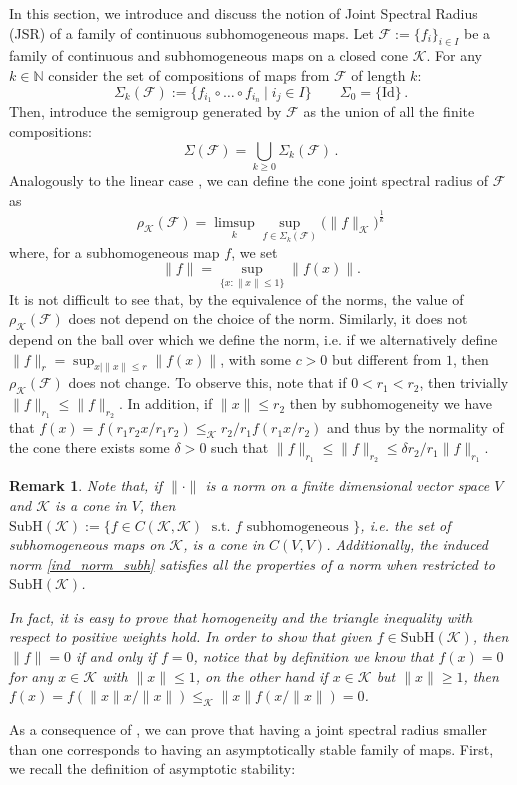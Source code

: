 \documentclass{article}
\newtheorem{remark}[theorem]{Remark}
\newcommand{\N}{\mathbb{N}}
\newcommand{\family}{\mathcal{F}}
\newcommand{\cradius}{\rho_{\cone}}
\newcommand{\comp}{\circ}
\newcommand{\cone}{\mathcal{K}}
\newcommand{\cleq}{\leq_{\cone}}
\begin{document}
In this section, we introduce and discuss the notion of Joint Spectral Radius (JSR) of a family of continuous subhomogeneous maps.
%
Let $\family:=\{f_i\}_{i\in I}$ be a family of continuous and subhomogeneous maps on a closed cone $\cone$. For any $k\in\N$ consider the set of compositions of maps from $\family$ of length $k$: 
\begin{equation}
\Sigma_k(\family):=\{f_{i_1}\comp \dots \comp f_{i_n}\:|\; i_j\in I\}\qquad \Sigma_0=\{\mathrm{Id}\}\,.
\end{equation}
%
Then, introduce the semigroup generated by $\family$ as the union of all the finite compositions:
%
\begin{equation}
\Sigma(\family)=\bigcup_{k\geq 0}\Sigma_k(\family)\,.
\end{equation}
%
Analogously to the linear case \cite{jungers2009joint}, we can define the cone joint spectral radius of $\family$ as
%
\begin{equation}\label{Cone_joint_spectral_radius}
\cradius(\family)=\limsup_{k}\sup_{f\in\Sigma_k(\family)}\big(\|f\|_{\cone}\big)^{\frac{1}{k}}
\end{equation}
where, for a subhomogeneous map $f$, we set
\begin{equation}\label{ind_norm_subh}
    \|f\|=\sup_{\{x:\|x\|\leq 1\}} \|f(x)\|.
\end{equation}
%
It is not difficult to see that, by the equivalence of the norms, the value of $\cradius(\family)$ does not depend on the choice of the norm. Similarly, it does not depend on the ball over which we define the norm, i.e. if we alternatively define $\|f\|_{r}=\sup_{x|\|x\|\leq r}\|f(x)\|$, with some $c>0$ but different from $1$, then $\cradius(\family)$ does not change. To observe this, note that if $0<r_1<r_2$, then trivially $\|f\|_{r_1}\leq \|f\|_{r_2}$. In addition, if $\|x\|\leq r_2$ then by subhomogeneity we have that $f(x)=f (r_1r_2x/r_1r_2)\cleq 
 r_2/r_1f(r_1x/r_2)$  and thus by the normality of the cone there exists some $\delta>0$ such that $\|f\|_{r_1}\leq \|f\|_{r_2}\leq \delta r_2/r_1 \|f\|_{r_1}$. 
%
\begin{remark}\label{rmk:norm_is_a_norm}
    Note that, if $\|\cdot\|$ is a norm on a finite dimensional vector space $V$ and $\cone$ is a cone in $V$, then $\text{SubH}(\cone):=\{f\in C(\cone,\cone)\;\text{ s.t. } f \text{ subhomogeneous } \}$, i.e. the set of subhomogeneous maps on $\cone$, is a cone in $C(V,V)$. Additionally, the induced norm \eqref{ind_norm_subh} satisfies all the properties of a norm when restricted to $\text{SubH}(\cone)$. 

    
    In fact, it is easy to prove that homogeneity and the triangle inequality with respect to positive weights hold. In order to show that given $f\in \text{SubH}(\cone)$, then $\|f\|=0$ if and only if $f=0$, notice that by definition we know that $f(x)=0$ for any $x\in \cone$ with $\|x\|\leq 1$, on the other hand if $x\in \cone$ but $\|x\|\geq 1$, then $f(x)=f(\|x\| x/\|x\|)\cleq \|x\| f(x/\|x\|)=0$.
\end{remark}
%
%
%
As a consequence of , we can prove that having a joint spectral radius smaller than one corresponds to having an asymptotically stable family of maps. First, we recall the definition of asymptotic stability:
\end{document}
